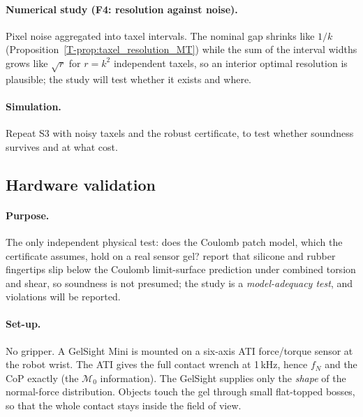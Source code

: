 \documentclass[11pt,a4paper]{article}
\newcommand{\M}{\mathcal M}
\newcommand{\T}[1]{\ref{T-#1}}                       %
\begin{document}
\paragraph{Numerical study (F4: resolution against noise).} Pixel noise aggregated into taxel intervals. The nominal gap shrinks like $1/k$
(Proposition~\T{prop:taxel_resolution_MT}) while the sum of the interval widths grows like $\sqrt r$ for $r=k^2$ independent taxels, so an interior
optimal resolution is plausible; the study will test whether it exists and where.
\paragraph{Simulation.} Repeat S3 with noisy taxels and the robust certificate, to test whether soundness survives and at what cost.

\subsection{Hardware validation}
\label{sec:hardware}
\paragraph{Purpose.} The only independent physical test: does the Coulomb patch model, which the certificate assumes, hold on a real sensor gel?
\citet[§3]{howe1996practical} report that silicone and rubber fingertips slip below the Coulomb limit-surface prediction under combined torsion and
shear, so soundness is not presumed; the study is a \emph{model-adequacy test}, and violations will be reported.
\paragraph{Set-up.} No gripper. A GelSight Mini is mounted on a six-axis ATI force/torque sensor at the robot wrist. The ATI gives the full contact
wrench at 1\,kHz, hence $f_N$ and the CoP exactly (the $\M_0$ information). The GelSight supplies only the \emph{shape} of the normal-force distribution.
Objects touch the gel through small flat-topped bosses, so that the whole contact stays inside the field of view.
\end{document}
